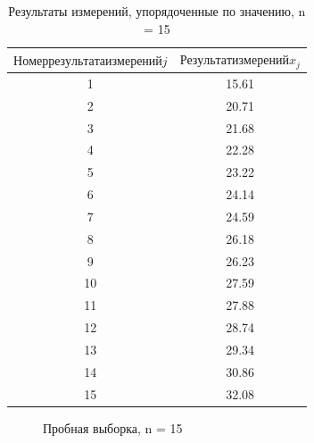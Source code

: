 \begin{table} [h]
\begin{center}
\begin{tabular}{|c|c|}
	\hline
	$Номер результата измерений j$ & $Результат измерений x_j$\\
	\hline
	1 & 15.61 \\ 
	\hline
	2 & 20.71 \\ 
	\hline
	3 & 21.68 \\ 
	\hline
	4 & 22.28 \\ 
	\hline
	5 & 23.22 \\ 
	\hline
	6 & 24.14 \\ 
	\hline
	7 & 24.59 \\ 
	\hline
	8 & 26.18 \\ 
	\hline
	9 & 26.23 \\ 
	\hline
	10 & 27.59 \\ 
	\hline
	11 & 27.88 \\ 
	\hline
	12 & 28.74 \\ 
	\hline
	13 & 29.34 \\ 
	\hline
	14 & 30.86 \\ 
	\hline
	15 & 32.08 \\ 
	\hline
\end{tabular}
\end{center}
\caption{Результаты измерений, упорядоченные по значению, n = 15}
\end{table} 

\begin{figure}[h]
\caption{Пробная выборка, n = 15}
\label{fig:box20}
\end{figure}


